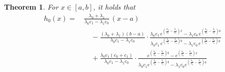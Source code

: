\documentclass{article}
\newtheorem{thm}{Theorem}
\begin{document}
\begin{thm}\label{thm:put4}
For $x\in[a,b]$, it holds that
\begin{align}\label{got1drift}h_0(x)=\,&\frac{\lambda_0+\lambda_1}{\lambda_0c_1-\lambda_1c_0}\,(x-a)\nonumber\\
&\quad-\frac{(\lambda_0+\lambda_1)(b-a)}{\lambda_0c_1-\lambda_1c_0}\cdot\frac{\lambda_0c_1\,e^{\left(\frac{\lambda_0}{c_0}-\frac{\lambda_1}{c_1}\right)x}-\lambda_1c_0\,e^{\left(\frac{\lambda_0}{c_0}-\frac{\lambda_1}{c_1}\right)a}}{\lambda_0c_1\,e^{\left(\frac{\lambda_0}{c_0}-\frac{\lambda_1}{c_1}\right)b}-\lambda_1c_0\,e^{\left(\frac{\lambda_0}{c_0}-\frac{\lambda_1}{c_1}\right)a}}\nonumber\\
&\quad+\frac{\lambda_0c_1(c_0+c_1)}{\lambda_0c_1-\lambda_1c_0}\cdot\frac{e^{\left(\frac{\lambda_0}{c_0}-\frac{\lambda_1}{c_1}\right)b}-e^{\left(\frac{\lambda_0}{c_0}-\frac{\lambda_1}{c_1}\right)x}}{\lambda_0c_1e^{\left(\frac{\lambda_0}{c_0}-\frac{\lambda_1}{c_1}\right)b}-\lambda_1c_0e^{\left(\frac{\lambda_0}{c_0}-\frac{\lambda_1}{c_1}\right)a}}

\end{align}
\end{thm}
\end{document}
